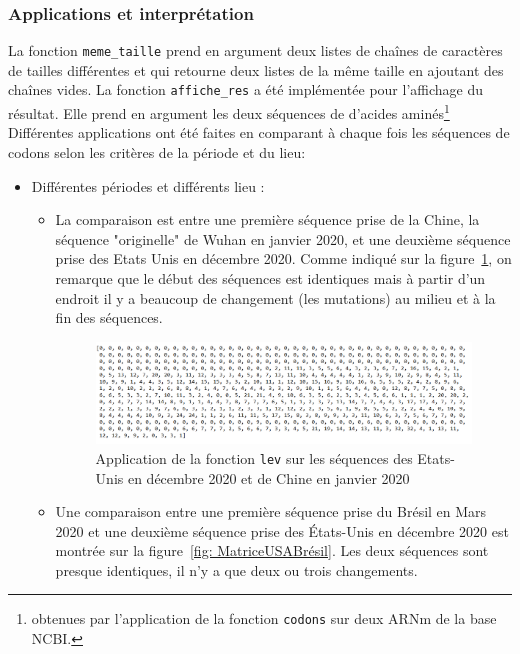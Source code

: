 \documentclass[12pt]{article}
\begin{document}
\subsubsection{Applications et interprétation}
La fonction \texttt{meme\_taille} prend en argument deux listes de chaînes de caractères de tailles différentes et qui retourne deux listes de la même taille en ajoutant des chaînes vides.
La fonction \texttt{affiche\_res} a été implémentée pour l'affichage du résultat. Elle prend en argument les deux séquences de d'acides aminés\footnote{obtenues par l'application de la fonction \texttt{codons} sur deux ARNm de la base NCBI.} \\
Différentes applications ont été faites en comparant à chaque fois les séquences de codons selon les critères de la période et du lieu: 
\begin{itemize}[label=\textbullet]%
    \item Différentes périodes et différents lieu : 
    \begin{itemize}
        \item La comparaison est entre une première séquence prise de la Chine, la séquence "originelle" de Wuhan en janvier 2020, et une deuxième séquence prise des Etats Unis en décembre 2020. 
        Comme indiqué sur la figure~\ref{fig: MatriceUSAchine}, on remarque que le début des séquences est identiques mais à partir d'un endroit il y a beaucoup de changement (les mutations) au milieu et à la fin des séquences.
        
    \begin{figure}[!h]
        \centering
        \includegraphics[scale = 0.65]{Images/Levenstein/USAChina DIFFERENTE PERIODE DIFFERENT LIEU.png}
        \caption{Application de la fonction \texttt{lev} sur les séquences des Etats-Unis en décembre 2020 et de Chine en janvier 2020 }
        \label{fig: MatriceUSAchine}
    \end{figure}
    
        \item Une comparaison entre une première séquence prise du Brésil en Mars 2020 et une deuxième séquence prise des États-Unis en décembre 2020 est montrée sur la figure~\ref{fig: MatriceUSABrésil}. Les deux séquences sont presque identiques, il n'y a que deux ou trois changements.\\
        

\end{itemize}
\end{itemize}
\end{document}
